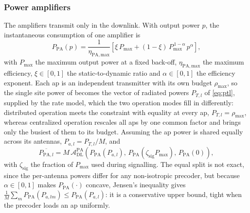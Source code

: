 \subsubsection{Power amplifiers}
\label{sssec:pa}
The amplifiers transmit only in the downlink. With output power $p$, the
instantaneous consumption of one amplifier is
\begin{equation}
\label{eq:pa}
P_{\mathrm{PA}}(p) = \frac{1}{\eta_{\mathrm{PA,max}}}
\left[\xi\,P_{\max} + (1-\xi)\,P_{\max}^{\,1-\alpha}\,p^{\alpha}\right],
\end{equation}
with $P_{\max}$ the maximum output power at a fixed back-off,
$\eta_{\mathrm{PA,max}}$ the maximum efficiency, $\xi\in[0,1]$ the
static-to-dynamic ratio and $\alpha\in[0,1]$ the efficiency exponent. Each
\gls{ap} is an independent transmitter with its own budget $\rho_{\max}$, so the
single site power of \cite{peschiera2026fr3} becomes the vector of radiated
powers $P_{T,l}$ of \eqref{eq:ptl}, supplied by the rate model, which the two
operation modes fill in differently: distributed operation meets the constraint
with equality at every \gls{ap}, $P_{T,l}=\rho_{\max}$, whereas centralized
operation
rescales all \glspl{ap} by one common factor and brings only the busiest of them
to its budget. Assuming the \gls{ap} power is shared equally across its antennas,
$P_{a,l}=P_{T,l}/M$, and
\begin{equation}
\label{eq:pa_avg_ap}
\overline{P_{\mathrm{PA},l}} = M\,
\mathcal{A}_{\mathrm{DL}}^{\mathrm{PA}}\!\left(
P_{\mathrm{PA}}(P_{a,l}),\,
P_{\mathrm{PA}}(\zeta_{\mathrm{sig}}P_{\max}),\,
P_{\mathrm{PA}}(0)\right),
\end{equation}
with $\zeta_{\mathrm{sig}}$ the fraction of $P_{\max}$ used during signalling.
The equal split is not exact, since the per-antenna powers differ for any
non-isotropic precoder, but because $\alpha\in[0,1]$ makes
$P_{\mathrm{PA}}(\cdot)$ concave, Jensen's inequality gives
$\frac{1}{M}\sum_{m}P_{\mathrm{PA}}(P_{a,lm})\leq P_{\mathrm{PA}}(P_{a,l})$: it
is a conservative upper bound, tight when the precoder loads an \gls{ap}
uniformly.

